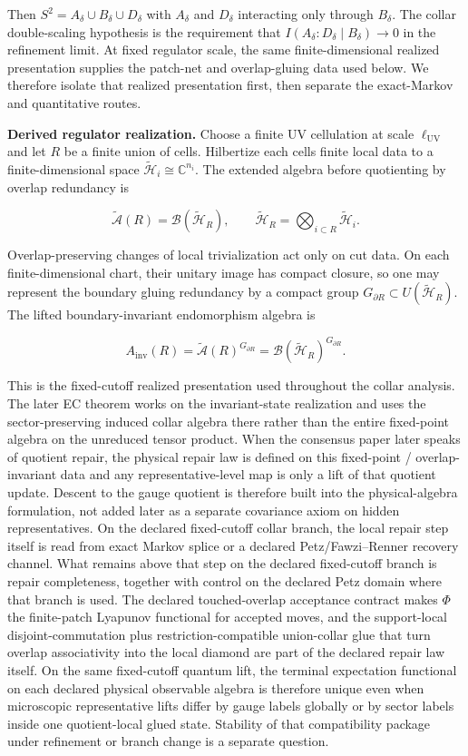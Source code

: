 Then \(S^2 = A_\delta \cup B_\delta \cup D_\delta\) with \(A_\delta\) and \(D_\delta\) interacting only through \(B_\delta\). The collar double-scaling hypothesis is the requirement that \(I(A_\delta:D_\delta \mid B_\delta) \to 0\) in the refinement limit. At fixed regulator scale, the same finite-dimensional realized presentation supplies the patch-net and overlap-gluing data used below. We therefore isolate that realized presentation first, then separate the exact-Markov and quantitative routes.

\textbf{Derived regulator realization.} Choose a finite UV cellulation at scale \(\ell_{\mathrm{UV}}\) and let \(R\) be a finite union of cells. Hilbertize each cell\textquotesingle s finite local data to a finite-dimensional space \(\tilde{\mathcal H}_i\cong \mathbb C^{n_i}\). The extended algebra before quotienting by overlap redundancy is

\[
\widetilde{\mathcal A}(R)=\mathcal B(\tilde{\mathcal H}_R),
\qquad
\tilde{\mathcal H}_R=\bigotimes_{i\subset R}\tilde{\mathcal H}_i.
\]

Overlap-preserving changes of local trivialization act only on cut data. On each finite-dimensional chart, their unitary image has compact closure, so one may represent the boundary gluing redundancy by a compact group \(G_{\partial R}\subset U(\tilde{\mathcal H}_R)\). The lifted boundary-invariant endomorphism algebra is

\[
A_{\mathrm{inv}}(R)=\widetilde{\mathcal A}(R)^{G_{\partial R}}
=\mathcal B(\tilde{\mathcal H}_R)^{G_{\partial R}}.
\]

This is the fixed-cutoff realized presentation used throughout the collar analysis. The later EC theorem works on the invariant-state realization and uses the sector-preserving induced collar algebra there rather than the entire fixed-point algebra on the unreduced tensor product.
When the consensus paper later speaks of quotient repair, the physical repair law is defined on
this fixed-point / overlap-invariant data and any representative-level map is only a lift of that
quotient update. Descent to the gauge quotient is therefore built into the physical-algebra
formulation, not added later as a separate covariance axiom on hidden representatives. On the
declared fixed-cutoff collar branch, the local repair step itself is read from exact Markov splice
or a declared Petz/Fawzi--Renner recovery channel. What remains above that step on the declared
fixed-cutoff branch is repair completeness, together with control on the declared Petz domain
where that branch is used. The declared touched-overlap acceptance contract makes \(\Phi\) the
finite-patch Lyapunov functional for accepted moves, and the support-local disjoint-commutation
plus restriction-compatible union-collar glue that turn overlap associativity into the local
diamond are part of the declared repair law itself. On the same fixed-cutoff quantum lift, the
terminal expectation functional on each declared physical observable algebra is therefore unique
even when microscopic representative lifts differ by gauge labels globally or by sector labels
inside one quotient-local glued state.
Stability of that compatibility package under
refinement or branch change is a separate question.

